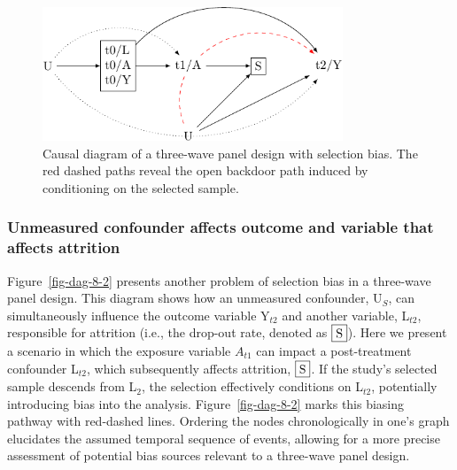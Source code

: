\documentclass[
  singlecolumn]{article}
\begin{document}
\begin{figure}

{\centering \includegraphics[width=0.8\textwidth,height=\textheight]{causal-dags_files/figure-pdf/fig-dag-8-1.pdf}

}

\caption{\label{fig-dag-8}Causal diagram of a three-wave panel design
with selection bias. The red dashed paths reveal the open backdoor path
induced by conditioning on the selected sample.}

\end{figure}

\hypertarget{unmeasured-confounder-affects-outcome-and-variable-that-affects-attrition}{%
\subsubsection{Unmeasured confounder affects outcome and variable that
affects
attrition}\label{unmeasured-confounder-affects-outcome-and-variable-that-affects-attrition}}

Figure~\ref{fig-dag-8-2} presents another problem of selection bias in a
three-wave panel design. This diagram shows how an unmeasured
confounder, U\(_S\), can simultaneously influence the outcome variable
Y\(_{t2}\) and another variable, L\(_{t2}\), responsible for attrition
(i.e., the drop-out rate, denoted as \(\framebox{S}\)). Here we present
a scenario in which the exposure variable \(A_{t1}\) can impact a
post-treatment confounder L\(_{t2}\), which subsequently affects
attrition, \(\framebox{S}\). If the study's selected sample descends
from L\(_2\), the selection effectively conditions on L\(_{t2}\),
potentially introducing bias into the analysis. Figure~\ref{fig-dag-8-2}
marks this biasing pathway with red-dashed lines. Ordering the nodes
chronologically in one's graph elucidates the assumed temporal sequence
of events, allowing for a more precise assessment of potential bias
sources relevant to a three-wave panel design.
\end{document}

